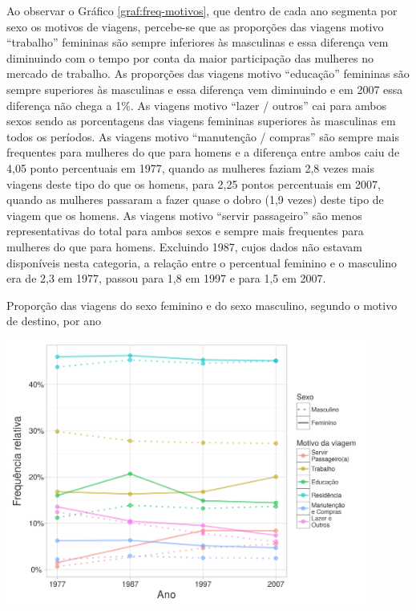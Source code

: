 Ao observar o Gráfico \ref{graf:freq-motivos}, que dentro de cada ano segmenta por sexo os motivos de viagens, percebe-se que as proporções das viagens motivo ``trabalho'' femininas são sempre inferiores às masculinas e essa diferença vem diminuindo com o tempo por conta da maior participação das mulheres no mercado de trabalho.
As proporções das viagens motivo ``educação'' femininas são sempre superiores às masculinas e essa diferença vem diminuindo e em 2007 essa diferença não chega a 1\%.
As viagens motivo ``lazer / outros'' cai para ambos sexos sendo as porcentagens das viagens femininas superiores às masculinas em todos os períodos.
As viagens motivo ``manutenção / compras'' são sempre mais frequentes para mulheres do que para homens e a diferença entre ambos caiu de 4,05 ponto percentuais em 1977, quando as mulheres faziam 2,8 vezes mais viagens deste tipo do que os homens, para 2,25 pontos percentuais em 2007, quando as mulheres passaram a fazer quase o dobro (1,9 vezes) deste tipo de viagem que os homens.
As viagens motivo ``servir passageiro'' são menos representativas do total para ambos sexos e sempre mais frequentes para mulheres do que para homens. Excluindo 1987, cujos dados não estavam disponíveis nesta categoria, a relação entre o percentual feminino e o masculino era de 2,3  em 1977, passou para 1,8 em 1997 e para 1,5 em 2007.

\begin{grafico}[htb]%
    \caption{\label{graf:freq-motivos}Proporção das viagens do sexo feminino e do sexo masculino, segundo o motivo de destino, por ano}%
    \begin{center}%
        \includegraphics[width=0.9\textwidth]{./imagens/freq-motivo.png}%
    \end{center}%
\end{grafico}%

